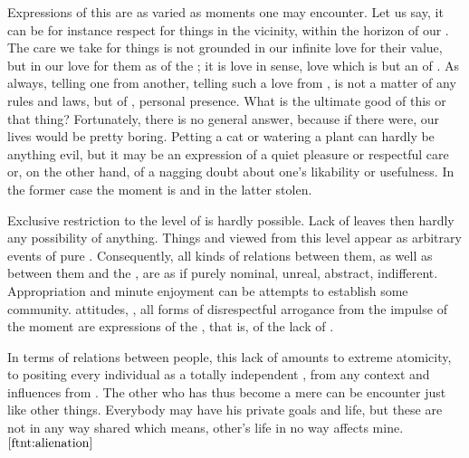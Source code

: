 Expressions of this are as varied as moments one may encounter. 
Let us say, it can be for instance respect for things in the
 vicinity, within the horizon of our . 
%
%
The care we take for things is not grounded in our infinite love for their
 value, but in our love for them as   of the
; it is love in  sense, love which is but an
 of .  As always, telling one from another, telling
such a love from , is not a matter of any rules and laws, but of
, personal presence.  What is the ultimate good of this or that
thing?  Fortunately, there is no general answer, because if there were, our
lives would be pretty boring. Petting a cat or watering a plant can hardly be
anything evil, but it may be an expression of a quiet pleasure or respectful
care or, on the other hand, of a nagging doubt about one's likability or
usefulness. In the former 
case the moment is  and in the latter stolen.

\pa\label{unfoundedImCom} %
Exclusive restriction to the level of  is hardly possible. Lack of
 leaves then hardly any possibility of 
anything.  Things and  viewed from this level appear as arbitrary
events of pure .  Consequently, all kinds of relations between
them, as well as between them and the , are as if purely nominal,
unreal, abstract, indifferent. Appropriation and minute enjoyment can be
attempts to establish some  community. 
attitudes, , all forms of disrespectful arrogance  from the impulse of
the moment are  expressions of the , that
is, of the lack of .

In terms of relations between people, this lack of  amounts to
extreme atomicity, to positing every individual as a totally independent
,  from any context and influences from .
The other who has thus become a mere  can be encounter  just
like other things.  Everybody may have his private goals and life, but these are
not in any way shared which means, other's life in no way affects mine.
$^{\ref{ftnt:alienation}}$ 

